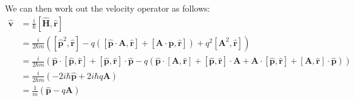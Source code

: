 \documentclass[a4paper]{scrartcl}
\begin{document}
We can then work out the velocity operator as follows:
\begin{align*}
    \hat{\mathbf{v}} &= \frac{i}{\hbar} [\hat{\mathbf{H}}, \hat{\mathbf{r}}] \\
    &= \frac{i}{2 \hbar m} \left([\hat{\mathbf{p}}^2, \hat{\mathbf{r}}] - q([\hat{\mathbf{p}} \cdot \mathbf{A}, \hat{\mathbf{r}}] + [\mathbf{A} \cdot \hat{\mathbf{p}}, \hat{\mathbf{r}}]) + q^2 [\mathbf{A}^2, \hat{\mathbf{r}}]\right) \\
    &= \frac{i}{2 \hbar m} (\hat{\mathbf{p}} \cdot [\hat{\mathbf{p}}, \hat{\mathbf{r}}] + [\hat{\mathbf{p}}, \hat{\mathbf{r}}] \cdot \hat{\mathbf{p}} - q(\hat{\mathbf{p}} \cdot [\mathbf{A}, \hat{\mathbf{r}}] + [\hat{\mathbf{p}}, \hat{\mathbf{r}}] \cdot \mathbf{A} + \mathbf{A} \cdot [\hat{\mathbf{p}}, \hat{\mathbf{r}}] + [\mathbf{A}, \hat{\mathbf{r}}] \cdot \hat{\mathbf{p}})) \\
    &= \frac{i}{2 \hbar m} (-2 i \hbar \hat{\mathbf{p}} + 2 i \hbar q \mathbf{A}) \\
    &= \frac{1}{m} (\hat{\mathbf{p}} - q \mathbf{A})
\end{align*}
\end{document}
